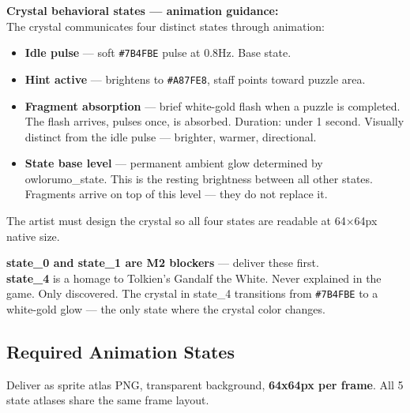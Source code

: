 \documentclass[11pt, a4paper]{article}
\newcommand{\hex}[1]{\textcolor[HTML]{#1}{\texttt{\##1}}}
\begin{document}
\vspace{6pt}
\begin{notebox}
  \textbf{Crystal behavioral states — animation guidance:}\\[4pt]
  The crystal communicates four distinct states through animation:
  \begin{itemize}[leftmargin=1.5em, itemsep=2pt]
    \item \textbf{Idle pulse} — soft \hex{7B4FBE} pulse at 0.8Hz. Base state.
    \item \textbf{Hint active} — brightens to \hex{A87FE8}, staff points toward puzzle area.
    \item \textbf{Fragment absorption} — brief white-gold flash when a puzzle is completed.
      The flash arrives, pulses once, is absorbed. Duration: under 1 second.
      Visually distinct from the idle pulse — brighter, warmer, directional.
    \item \textbf{State base level} — permanent ambient glow determined by owlorumo\_state.
      This is the resting brightness between all other states.
      Fragments arrive on top of this level — they do not replace it.
  \end{itemize}
  The artist must design the crystal so all four states are readable
  at 64×64px native size.
\end{notebox}
\begin{notebox}
  \textbf{state\_0 and state\_1 are M2 blockers} --- deliver these first.\\[4pt]
  \textbf{state\_4} is a homage to Tolkien's Gandalf the White. Never explained in the game.
  Only discovered. The crystal in state\_4 transitions from \hex{7B4FBE} to a white-gold glow
  --- the only state where the crystal color changes.
\end{notebox}

\subsection{Required Animation States}

Deliver as sprite atlas PNG, transparent background, \textbf{64x64px per frame}.
All 5 state atlases share the same frame layout.
\end{document}
